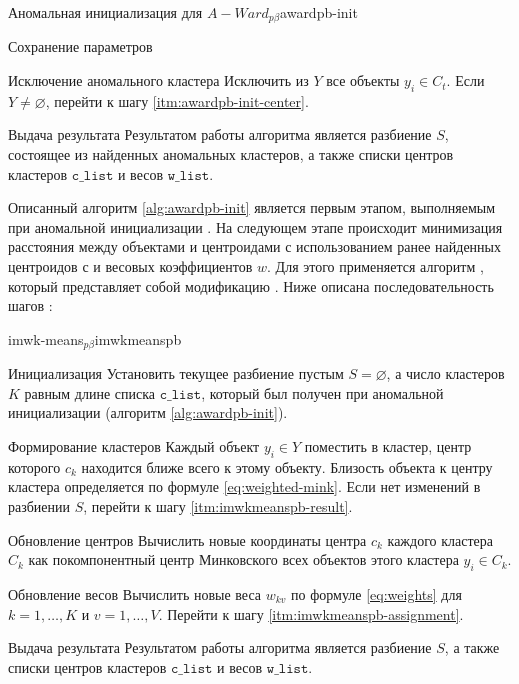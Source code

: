 \documentclass[12pt]{diploma}
\begin{document}
\begin{algorithm}{Аномальная инициализация для $ A-Ward_{p\beta} $}{awardpb-init}
\begin{astep}{Сохранение параметров}
			\end{astep}
			\begin{astep}{Исключение аномального кластера}
				Исключить из $ Y $ все объекты $ y_i \in C_t $. Если $ Y \neq \varnothing $, перейти к шагу \ref{itm:awardpb-init-center}.
			\end{astep}
			\begin{astep}{Выдача результата}
				Результатом работы алгоритма является разбиение $ S $, состоящее из найденных аномальных кластеров, а также списки центров кластеров $ \mathtt{c\_list} $ и весов $ \mathtt{w\_list} $.
			\end{astep}
		\end{algorithm}
		
		Описанный алгоритм \ref{alg:awardpb-init} является первым этапом, выполняемым при аномальной инициализации \AWardpb. На следующем этапе происходит минимизация расстояния между объектами и центроидами с использованием ранее найденных центроидов $ с $ и весовых коэффициентов $ w $. Для этого применяется алгоритм \imwkmeanspb, который представляет собой модификацию \kmeans. Ниже описана последовательность шагов \imwkmeanspb:
		
		\begin{algorithm}{\mbox{imwk-means$ _{p\beta} $}}{imwkmeanspb}
			\begin{astep}{Инициализация}
				Установить текущее разбиение пустым $ S=\varnothing $, а число кластеров $ K $ равным длине списка $ \mathtt{c\_list} $, который был получен при аномальной инициализации (алгоритм  \ref{alg:awardpb-init}). 
			\end{astep}
			\begin{astep}{Формирование кластеров}\label{itm:imwkmeanspb-assignment}
				Каждый объект $ y_i \in Y $ поместить в кластер, центр которого $ c_k $ находится ближе всего к этому объекту. Близость объекта к центру кластера определяется  по формуле \eqref{eq:weighted-mink}. Если нет изменений в разбиении $  S $, перейти к шагу \ref{itm:imwkmeanspb-result}.
			\end{astep}
			\begin{astep}{Обновление центров} 
				Вычислить новые координаты центра $ c_k $ каждого кластера $ C_k $ как покомпонентный центр Минковского всех объектов этого кластера $ y_i \in C_k $.
			\end{astep}
			\begin{astep}{Обновление весов} 
				Вычислить новые веса $ w_{kv} $ по формуле \eqref{eq:weights} для $ k=1,\ldots,K $ и $ v=1,\ldots,V $. Перейти к шагу \ref{itm:imwkmeanspb-assignment}.
			\end{astep}
			\begin{astep}{Выдача результата} \label{itm:imwkmeanspb-result}
				Результатом работы алгоритма является разбиение $ S $, а также списки центров кластеров $ \mathtt{c\_list} $ и весов $ \mathtt{w\_list} $.
			\end{astep}			
		\end{algorithm}
		
\end{document}
